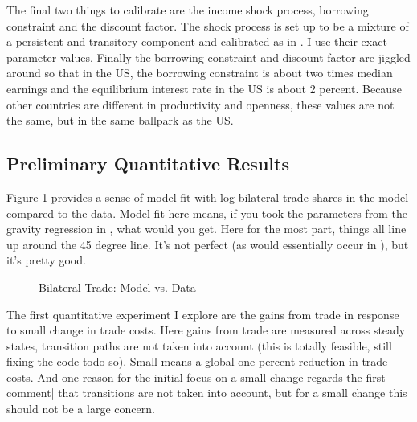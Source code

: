 \documentclass[12pt,pdftex]{article}
\begin{document}
\begin{onehalfspacing}
The final two things to calibrate are the income shock process, borrowing constraint and the discount factor. The shock process is set up to be a mixture of a persistent and transitory component and calibrated as in \citet*{krueger2016macroeconomics}. I use their exact parameter values. Finally the borrowing constraint and discount factor are jiggled around so that in the US, the borrowing constraint is about two times median earnings and the equilibrium interest rate in the US is about 2 percent. Because other countries are different in productivity and openness, these values are not the same, but in the same ballpark as the US.

\subsection{Preliminary Quantitative Results}

Figure \ref{fig:model-fit} provides a sense of model fit with log bilateral trade shares in the model compared to the data.  Model fit here means, if you took the parameters from the gravity regression in \citet{eaton2002technology}, what would you get. Here for the most part, things all line up around the 45 degree line. It's not perfect (as would essentially occur in \citet{eaton2002technology}), but it's pretty good.

\begin{figure}[!t]
\caption{Bilateral Trade: Model vs. Data}\label{fig:model-fit}
\end{figure}


The first quantitative experiment I explore are the gains from trade in response to small change in trade costs. Here gains from trade are measured across steady states, transition paths are not taken into account (this is totally feasible, still fixing the code todo so). Small means a global one percent reduction in trade costs. And one reason for the initial focus on a small change regards the first comment| that transitions are not taken into account, but for a small change this should not be a large concern.


\end{onehalfspacing}
\end{document}
